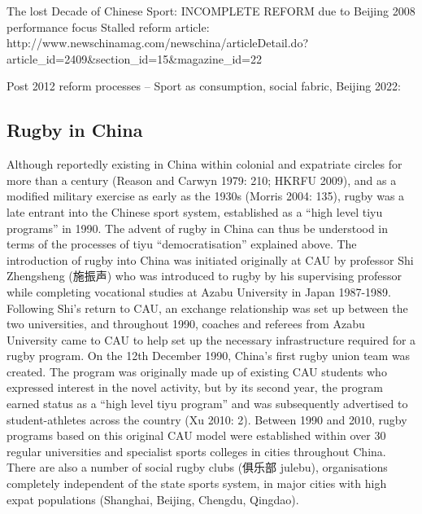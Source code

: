 The lost Decade of Chinese Sport:
INCOMPLETE REFORM due to Beijing 2008 performance focus
Stalled reform article: http://www.newschinamag.com/newschina/articleDetail.do?article_id=2409&section_id=15&magazine_id=22



Post 2012 reform processes -- Sport as consumption, social fabric, Beijing 2022:















\subsection{Rugby in China}
Although reportedly existing in China within colonial and expatriate circles for more than a century (Reason and Carwyn 1979: 210; HKRFU 2009), and as a modified military exercise as early as the 1930s (Morris 2004: 135), rugby was a late entrant into the Chinese sport system, established as a “high level tiyu programs” in 1990.  The advent of rugby in China can thus be understood in terms of the processes of tiyu “democratisation” explained above.  The introduction of rugby into China was initiated originally at CAU by professor Shi Zhengsheng (施振声) who was introduced to rugby by his supervising professor while completing vocational studies at Azabu University in Japan 1987-1989.  Following Shi’s return to CAU, an exchange relationship was set up between the two universities, and throughout 1990, coaches and referees from Azabu University came to CAU to help set up the necessary infrastructure required for a rugby program.  On the 12th December 1990, China’s first rugby union team was created.  The program was originally made up of existing CAU students who expressed interest in the novel activity, but by its second year, the program earned status as a “high level tiyu program” and was subsequently advertised to student-athletes across the country (Xu 2010: 2).  Between 1990 and 2010, rugby programs based on this original CAU model were established within over 30 regular universities and specialist sports colleges in cities throughout China.  There are also a number of social rugby clubs (俱乐部 julebu), organisations completely independent of the state sports system, in major cities with high expat populations (Shanghai, Beijing, Chengdu, Qingdao).


